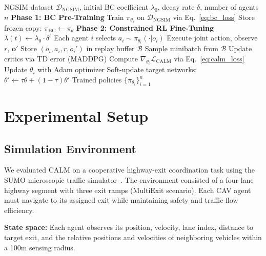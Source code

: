 \documentclass[journal]{IEEEtran}
\begin{document}
\begin{algorithm}[t]
\caption{CALM: Constrained Actor-Learning from deMonstrations}
\label{alg:calm}
\begin{algorithmic}[1]
\REQUIRE NGSIM dataset $\mathcal{D}_{\text{NGSIM}}$, initial BC coefficient $\lambda_0$, decay rate $\delta$, number of agents $n$
\STATE \textbf{Phase 1: BC Pre-Training}
    \STATE Train $\pi_{\theta_i}$ on $\mathcal{D}_{\text{NGSIM}}$ via Eq.~\eqref{eq:bc_loss}
\ENDFOR
\STATE Store frozen copy: $\pi_{\text{BC}} \leftarrow \pi_\theta$
\STATE
\STATE \textbf{Phase 2: Constrained RL Fine-Tuning}
    \STATE $\lambda(t) \leftarrow \lambda_0 \cdot \delta^t$
        \STATE Each agent $i$ selects $a_i \sim \pi_{\theta_i}(\cdot | o_i)$
        \STATE Execute joint action, observe $r$, $\bm{o}'$
        \STATE Store $(o_i, a_i, r, o_i')$ in replay buffer $\mathcal{B}$
    \ENDFOR
    \STATE Sample minibatch from $\mathcal{B}$
    \STATE Update critics via TD error (MADDPG)
        \STATE Compute $\nabla_{\theta_i} \mathcal{L}_{\text{CALM}}$ via Eq.~\eqref{eq:calm_loss}
        \STATE Update $\theta_i$ with Adam optimizer
    \ENDFOR
    \STATE Soft-update target networks: $\theta' \leftarrow \tau\theta + (1-\tau)\theta'$
\ENDFOR
\RETURN Trained policies $\{\pi_{\theta_i}\}_{i=1}^n$
\end{algorithmic}
\end{algorithm}

\section{Experimental Setup}
\label{sec:setup}

\subsection{Simulation Environment}

We evaluated CALM on a cooperative highway-exit coordination task using the SUMO microscopic traffic simulator~\cite{lopez2018microscopic}. The environment consisted of a four-lane highway segment with three exit ramps (MultiExit scenario). Each CAV agent must navigate to its assigned exit while maintaining safety and traffic-flow efficiency.

\textbf{State space:} Each agent observes its position, velocity, lane index, distance to target exit, and the relative positions and velocities of neighboring vehicles within a 100m sensing radius.
\end{document}
